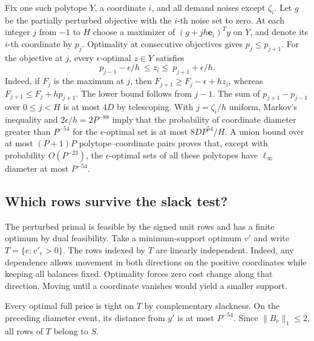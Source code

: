\documentclass[11pt,letterpaper]{article}
\begin{document}
Fix one such polytope \(Y\), a coordinate \(i\), and all demand noises
except \(\zeta_i\). Let \(g\) be the partially perturbed objective with
the \(i\)-th noise set to zero. At each integer \(j\) from \(-1\) to \(H\)
choose a maximizer of \((g+jh\mathbf e_i)^Ty\) on \(Y\), and denote its
\(i\)-th coordinate by \(p_j\). Optimality at consecutive objectives gives
\(p_j\le p_{j+1}\). For the objective at \(j\), every
\(\epsilon\)-optimal \(z\in Y\) satisfies
\[
       p_{j-1}-\epsilon/h\ \le z_i\le\ p_{j+1}+\epsilon/h.
\]
Indeed, if \(F_j\) is the maximum at \(j\), then
\(F_{j+1}\ge F_j-\epsilon+h z_i\), whereas
\(F_{j+1}\le F_j+h p_{j+1}\). The lower bound follows from \(j-1\).
The sum of \(p_{j+1}-p_{j-1}\) over \(0\le j<H\) is at most \(4D\)
by telescoping. With \(j=\zeta_i/h\) uniform, Markov's inequality and
\(2\epsilon/h=2P^{-88}\) imply that the probability of coordinate
diameter greater than \(P^{-54}\) for the \(\epsilon\)-optimal set is
at most \(8D P^{54}/H\). A union bound over at most \((P+1)P\)
polytope--coordinate pairs proves that, except with probability
\(O(P^{-23})\), the \(\epsilon\)-optimal sets of all these polytopes
have \(\ell_\infty\) diameter at most \(P^{-54}\).

\subsection{Which rows survive the slack test?}

The perturbed primal is feasible by the signed unit rows and has a finite
optimum by dual feasibility. Take a minimum-support optimum \(v'\) and
write \(T=\{e:v'_e>0\}\). The rows indexed by \(T\) are linearly
independent. Indeed, any dependence allows movement in both directions
on the positive coordinates while keeping all balances fixed. Optimality
forces zero cost change along that direction. Moving until a coordinate
vanishes would yield a smaller support.

Every optimal full price is tight on \(T\) by complementary slackness.
On the preceding diameter event, its distance from \(y'\) is at most
\(P^{-54}\). Since \(\|B_e\|_1\le2\), all rows of \(T\) belong to \(S\).
\end{document}
